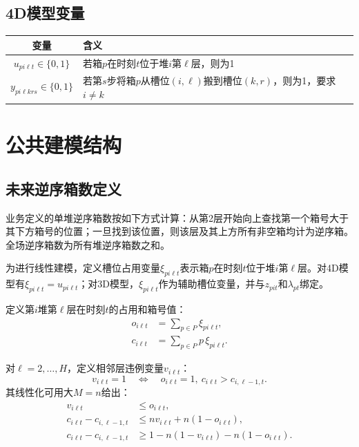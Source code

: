 \documentclass[11pt,a4paper]{ctexart}
\begin{document}
\subsection{4D模型变量}
\begin{table}[H]
\centering
\renewcommand{\arraystretch}{1.35}
\begin{tabularx}{0.92\textwidth}{>{\bfseries}c >{\raggedright\arraybackslash}X}
\toprule
变量 & 含义 \\
\midrule
$u_{pi\ell t} \in \{0,1\}$ & 若箱$p$在时刻$t$位于堆$i$第$\ell$层，则为1 \\
$y_{pi\ell krs} \in \{0,1\}$ & 若第$s$步将箱$p$从槽位$(i,\ell)$搬到槽位$(k,r)$，则为1，要求$i\ne k$ \\
\bottomrule
\end{tabularx}
\end{table}

\section{公共建模结构}

\subsection{未来逆序箱数定义}
业务定义的单堆逆序箱数按如下方式计算：从第2层开始向上查找第一个箱号大于其下方箱号的位置；一旦找到该位置，则该层及其上方所有非空箱均计为逆序箱。全场逆序箱数为所有堆逆序箱数之和。

为进行线性建模，定义槽位占用变量$\xi_{pi\ell t}$表示箱$p$在时刻$t$位于堆$i$第$\ell$层。对4D模型有$\xi_{pi\ell t}=u_{pi\ell t}$；对3D模型，$\xi_{pi\ell t}$作为辅助槽位变量，并与$z_{pit}$和$\lambda_{pt}$绑定。

定义第$i$堆第$\ell$层在时刻$t$的占用和箱号值：
\begin{align}
o_{i\ell t} &= \sum_{p\in P}\xi_{pi\ell t},\\
c_{i\ell t} &= \sum_{p\in P}p\,\xi_{pi\ell t}.
\end{align}

对$\ell=2,\ldots,H$，定义相邻层违例变量$v_{i\ell t}$：
\begin{equation}
v_{i\ell t}=1
\quad\Longleftrightarrow\quad
o_{i\ell t}=1,\ c_{i\ell t}>c_{i,\ell-1,t}.
\end{equation}
其线性化可用大$M=n$给出：
\begin{align}
v_{i\ell t} &\le o_{i\ell t},\\
c_{i\ell t}-c_{i,\ell-1,t}
&\le n v_{i\ell t}+n(1-o_{i\ell t}),\\
c_{i\ell t}-c_{i,\ell-1,t}
&\ge 1-n(1-v_{i\ell t})-n(1-o_{i\ell t}).
\end{align}
\end{document}
